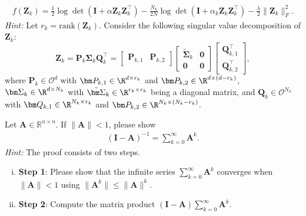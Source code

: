 \documentclass[../../book-main.tex]{subfiles}
\begin{document}
\begin{exercise}
\begin{enumerate}
\begin{align*}
                f(\bm Z_k) = \frac{1}{2}\log\det\left(\bm I + \alpha\bm
                Z_k\bm Z_k^\top \right) - \frac{N_k}{2N}\log\det\left(\bm I +
                \alpha_k \bm Z_k\bm Z_k^\top \right) -
                \frac{\lambda}{2}\|\bm Z_k\|_F^2.
            \end{align*}
            {\em Hint:} Let $r_k=\mathrm{rank}(\bm Z_k)$. Consider the
            following singular value decomposition of $\bm Z_k$:
            \begin{equation}
                \bm Z_k = \bm P_k\bm \Sigma_k\bm Q_k^\top =
                \begin{bmatrix}
                    \bm P_{k,1} & \bm P_{k,2}
                \end{bmatrix}
                \begin{bmatrix}
                    \tilde{\bm \Sigma}_{k} & \bm 0 \\
                    \bm 0 & \bm 0
                \end{bmatrix}
                \begin{bmatrix}
                    \bm Q_{k,1}^\top \\ \bm Q_{k,2}^\top
                \end{bmatrix},
            \end{equation}
            where $\bm P_k \in \mathcal{O}^d$ with $\bm P_{k,1} \in
            \R^{d\times r_k}$ and  $\bm P_{k,2} \in \R^{d\times (d-r_k)}$,
            $\bm \Sigma_k \in \R^{d\times N_k}$ with $\tilde{\bm \Sigma}_{k}
            \in \R^{r_k\times r_k}$ being a diagonal matrix, and  $\bm Q_k
            \in \mathcal{O}^{N_k}$ with $\bm Q_{k,1} \in \R^{N_k\times r_k}$
            and  $\bm P_{k,2} \in \R^{N_k \times (N_k-r_k)}$.
    \end{enumerate}
\end{exercise}

\begin{exercise}\label{ex:neumannn}
    Let $\bm A \in \mathbb{R}^{n\times n}$. If $\|\bm A\| < 1$, please show
    \begin{align}\label{eq:neumann}
        \left( \bm I - \bm A\right)^{-1} = \sum_{k=0}^\infty \bm A^k.
    \end{align}
    {\em Hint:} The proof consists of two steps.
    \begin{enumerate}[(i)]
        \item {\bf Step 1}: Please show that the infinite series
            $\sum_{k=0}^\infty \bm A^k$ converges when $\|\bm A\| < 1$ using
            $\|\bm A^k\| \le \|\bm A\|^k$.
        \item {\bf Step 2}: Compute the matrix product $(\bm I - \bm A)
            \sum_{k=0}^\infty \bm A^k$.
    \end{enumerate}
\end{exercise}
\end{document}
